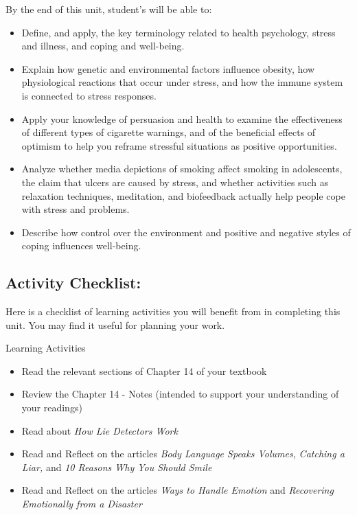 \documentclass[
]{book}
\providecommand{\tightlist}{%
  \setlength{\itemsep}{0pt}\setlength{\parskip}{0pt}}
\begin{document}
By the end of this unit, student's will be able to:

\begin{itemize}
\tightlist
\item
  Define, and apply, the key terminology related to health psychology, stress and illness, and coping and well-being.\\
\item
  Explain how genetic and environmental factors influence obesity, how physiological reactions that occur under stress, and how the immune system is connected to stress responses.\\
\item
  Apply your knowledge of persuasion and health to examine the effectiveness of different types of cigarette warnings, and of the beneficial effects of optimism to help you reframe stressful situations as positive opportunities.\\
\item
  Analyze whether media depictions of smoking affect smoking in adolescents, the claim that ulcers are caused by stress, and whether activities such as relaxation techniques, meditation, and biofeedback actually help people cope with stress and problems.\\
\item
  Describe how control over the environment and positive and negative styles of coping influences well-being.
\end{itemize}

\hypertarget{activity-checklist-7}{%
\subsection*{Activity Checklist:}\label{activity-checklist-7}}

Here is a checklist of learning activities you will benefit from in completing this unit. You may find it useful for planning your work.

\begin{reflect}
{Learning Activities}

\begin{itemize}
\tightlist
\item
  Read the relevant sections of Chapter 14 of your textbook
\item
  Review the Chapter 14 - Notes (intended to support your understanding of your readings)
\item
  Read about \emph{How Lie Detectors Work}\\
\item
  Read and Reflect on the articles \emph{Body Language Speaks Volumes,} \emph{Catching a Liar,} and \emph{10 Reasons Why You Should Smile}
\item
  Read and Reflect on the articles \emph{Ways to Handle Emotion} and \emph{Recovering Emotionally from a Disaster}
\end{itemize}
\end{reflect}
\end{document}

